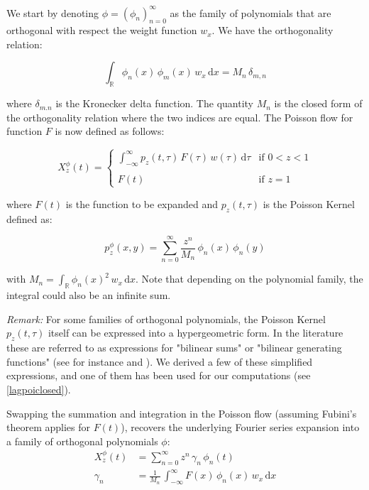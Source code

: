 \documentclass[a4paper,11pt,twoside]{amsart}
\newcommand{\verifiedeq}{=}
\newcommand{\defeq}{=}
\newcommand{\verifiedeq}{\stackrel{\checkmark}{=}}
\newcommand{\defeq}{\stackrel{\scriptscriptstyle \textnormal{def}}{=}}
\begin{document}
We start by denoting $\phi \verifiedeq \left(\phi_n\right)_{n=0}^\infty$ as the family of polynomials that are orthogonal with respect the weight function $w_x$. We have the orthogonality relation:

\begin{equation}\label{ortrel}
 \int_{\mathbb{R}} \phi_n(x)\,\phi_m(x)\,w_x\, \mathrm{d}x = M_n\,\delta_{m,n}
\end{equation}

where $\delta_{m.n}$ is the Kronecker delta function. The quantity $M_n$ is the closed form of the orthogonality relation where the two indices are equal. The Poisson flow for function $F$ is now defined as follows:

\begin{equation}\label{poiflow}
X^\phi_z(t)\defeq
    \begin{cases}
        \int_{-\infty}^{\infty} p_z(t, \tau)\,F(\tau)\,w(\tau)\,\mathrm{d}\tau & \text{if } 0 < z < 1\\
        \\
        F(t) & \text{if } z = 1
    \end{cases}
\end{equation}

where $F(t)$ is the function to be expanded and $p_z(t, \tau)$ is the Poisson Kernel defined as:

\begin{equation}\label{poiker}
 p^\phi_z(x,y) \defeq \sum_{n=0}^\infty\frac{z^n}{M_n}\, \phi_n(x)\,\phi_n(y)
\end{equation}

with $M_n \verifiedeq \int_\mathbb{R}\phi_n(x)^2\,w_x\,\mathrm{d}x$. Note that depending on the polynomial family, the integral could also be an infinite sum.

\textit{Remark:} For some families of orthogonal polynomials, the Poisson Kernel $p_z(t, \tau)$ itself can be expressed into a hypergeometric form. In the literature these are referred to as expressions for "bilinear sums" or "bilinear generating functions" (see for instance \cite{genoverview} and \cite{meipolgen}). We derived a few of these simplified expressions, and one of them has been used for our computations (see \ref{lagpoiclosed}).

Swapping the summation and integration in the Poisson flow (assuming Fubini's theorem applies for $F(t)$), recovers the underlying Fourier series expansion into a family of orthogonal polynomials $\phi$:
\begin{align}
 X^\phi_z(t) &\verifiedeq \sum_{n=0}^\infty z^n\,\gamma_n\,\phi_n(t) \\
 \gamma_n &\verifiedeq \frac{1}{M_n}\,\int_{-\infty}^\infty F(x)\,\phi_n(x)\,w_x \,\mathrm{d}x
\end{align}
\end{document}
